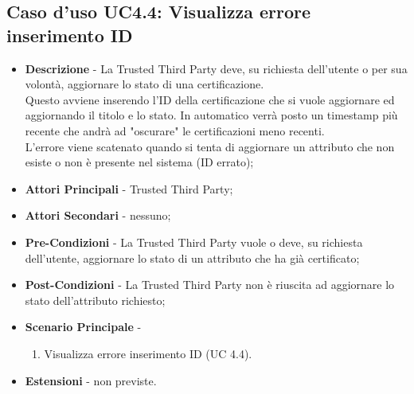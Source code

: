 \subsection{Caso d'uso UC4.4: Visualizza errore inserimento ID}
\begin{itemize}
	\item \textbf{Descrizione} - La Trusted Third Party deve, su richiesta dell'utente o per sua volontà, aggiornare lo stato di una certificazione.\\
	Questo avviene inserendo l'ID della certificazione che si vuole aggiornare ed aggiornando il titolo e lo stato. In automatico verrà posto un timestamp più recente che andrà ad "oscurare" le certificazioni meno recenti.\\
	L'errore viene scatenato quando si tenta di aggiornare un attributo che non esiste o non è presente nel sistema (ID errato);
	\item \textbf{Attori Principali} - Trusted Third Party;
	\item \textbf{Attori Secondari} - nessuno;
	\item \textbf{Pre-Condizioni} - La Trusted Third Party vuole o deve, su richiesta dell'utente, aggiornare lo stato di un attributo che ha già certificato;
	\item \textbf{Post-Condizioni} - La Trusted Third Party non è riuscita ad aggiornare lo stato dell'attributo richiesto;
	\item \textbf{Scenario Principale} -
	\begin{enumerate}
		\item Visualizza errore inserimento ID (UC 4.4).
	\end{enumerate}
	\item \textbf{Estensioni} - non previste.
\end{itemize}
\newpage
